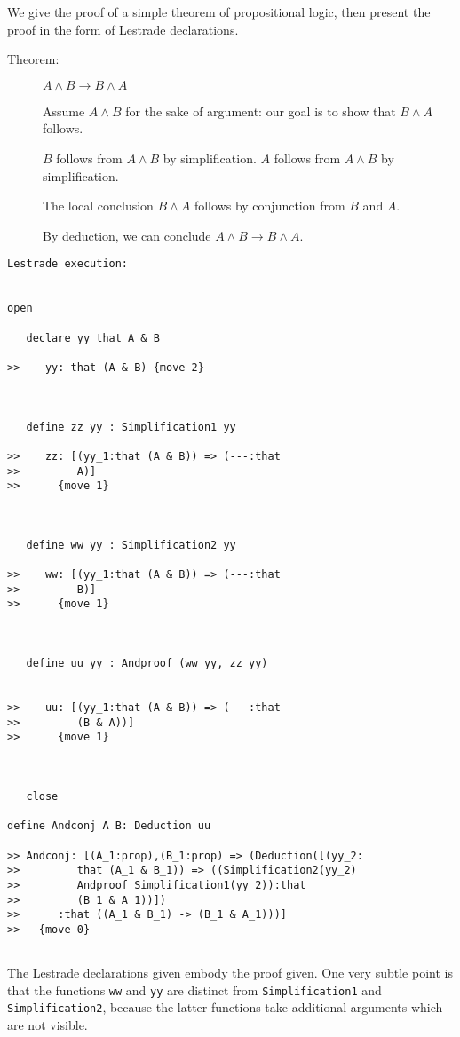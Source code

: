 \documentclass[12pt]{article}
\begin{document}
We give the proof of a simple theorem of propositional logic, then present the proof in the form of Lestrade declarations.

\begin{description}

\item[Theorem:]  $A \wedge B \rightarrow B \wedge A$

Assume $A \wedge B$ for the sake of argument:  our goal is to show that $B \wedge A$ follows.

$B$ follows from $A \wedge B$ by simplification.  $A$ follows from $A \wedge B$ by simplification.  

The local conclusion $B \wedge A$ follows by conjunction from $B$ and $A$.

By deduction, we can conclude $A \wedge B \rightarrow B \wedge A$.

\end{description}

\begin{verbatim}Lestrade execution:


open

   declare yy that A & B

>>    yy: that (A & B) {move 2}



   define zz yy : Simplification1 yy

>>    zz: [(yy_1:that (A & B)) => (---:that
>>         A)]
>>      {move 1}



   define ww yy : Simplification2 yy

>>    ww: [(yy_1:that (A & B)) => (---:that
>>         B)]
>>      {move 1}



   define uu yy : Andproof (ww yy, zz yy)


>>    uu: [(yy_1:that (A & B)) => (---:that
>>         (B & A))]
>>      {move 1}



   close

define Andconj A B: Deduction uu

>> Andconj: [(A_1:prop),(B_1:prop) => (Deduction([(yy_2:
>>         that (A_1 & B_1)) => ((Simplification2(yy_2)
>>         Andproof Simplification1(yy_2)):that
>>         (B_1 & A_1))])
>>      :that ((A_1 & B_1) -> (B_1 & A_1)))]
>>   {move 0}


\end{verbatim}

The Lestrade declarations given embody the proof given.  One very subtle point is that the functions {\tt ww} and {\tt yy} are
distinct from {\tt Simplification1} and {\tt Simplification2}, because the latter functions take additional arguments which are not visible.
\end{document}
